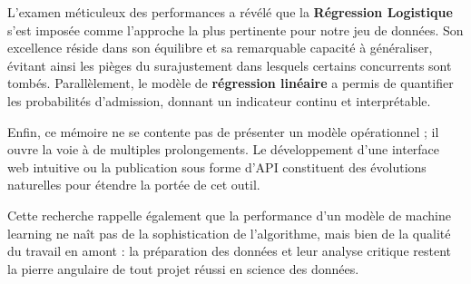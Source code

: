 L’examen méticuleux des performances a révélé que la \textbf{Régression Logistique} s’est imposée comme l’approche la plus pertinente pour notre jeu de données. Son excellence réside dans son équilibre et sa remarquable capacité à généraliser, évitant ainsi les pièges du surajustement dans lesquels certains concurrents sont tombés. Parallèlement, le modèle de \textbf{régression linéaire} a permis de quantifier les probabilités d’admission, donnant un indicateur continu et interprétable.

Enfin, ce mémoire ne se contente pas de présenter un modèle opérationnel ; il ouvre la voie à de multiples prolongements. Le développement d’une interface web intuitive ou la publication sous forme d’API constituent des évolutions naturelles pour étendre la portée de cet outil.  

\bigskip
Cette recherche rappelle également que la performance d’un modèle de machine learning ne naît pas de la sophistication de l’algorithme, mais bien de la qualité du travail en amont : la préparation des données et leur analyse critique restent la pierre angulaire de tout projet réussi en science des données.
